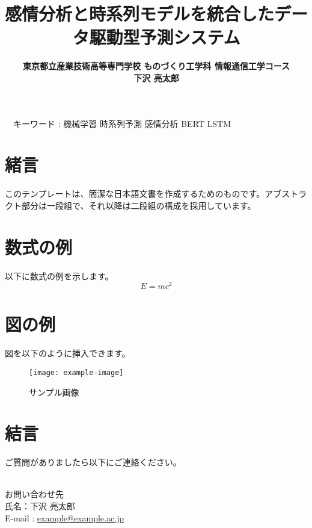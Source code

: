 \documentclass[a4paper,11pt]{article}
\title{{\TitleJFont\bfseries 感情分析と時系列モデルを統合したデータ駆動型予測システム \\ }}
\author{\large\TitleJFont\bfseries 東京都立産業技術高等専門学校 ものづくり工学科 情報通信工学コース \\ \large\TitleJFont\bfseries 下沢 亮太郎}
\date{}
\newenvironment{customabstract}
{\noindent\hfuzz=10pt\hbadness=10000\begin{flushleft}\small}
{\end{flushleft}}
\begin{document}
\maketitle
\thispagestyle{empty}

\begin{customabstract}
　キーワード : 機械学習 時系列予測 感情分析 BERT LSTM
\end{customabstract}

\setlength{\columnsep}{40pt}

\begin{multicols}{2}

\section{緒言}
このテンプレートは、簡潔な日本語文書を作成するためのものです。アブストラクト部分は一段組で、それ以降は二段組の構成を採用しています。

\section{数式の例}
以下に数式の例を示します。
\begin{equation}
E = mc^2
\end{equation}

\section{図の例}
図を以下のように挿入できます。
\begin{figure}[h]
    \centering
    \texttt{[image: example-image]} %
    \caption{サンプル画像}
\end{figure}

\section{結言}
ご質問がありましたら以下にご連絡ください。

\noindent\hrulefill\\
お問い合わせ先\\
氏名：下沢 亮太郎 \\
E-mail : \href{mailto:example@example.ac.jp}{example@example.ac.jp}

\end{multicols}
\end{document}
